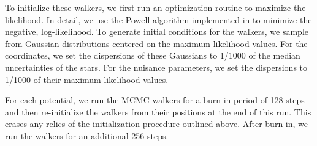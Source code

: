 \documentclass[letterpaper,12pt,preprint]{aastex}
\begin{document}
To initialize these walkers, we first run an optimization routine to maximize the likelihood. In detail, we use the Powell algorithm implemented in  \citep{powell64, scipy} to minimize the negative, log-likelihood. To generate initial conditions for the walkers, we sample from Gaussian distributions centered on the maximum likelihood values. For the coordinates, we set the dispersions of these Gaussians to 1/1000 of the median uncertainties of the stars. For the nuisance parameters, we set the dispersions to 1/1000 of their maximum likelihood values. 

For each potential, we run the MCMC walkers for a burn-in period of 128 steps and then re-initialize the walkers from their positions at the end of this run. This erases any relics of the initialization procedure outlined above. After burn-in, we run the walkers for an additional 256 steps.
%
%
\end{document}

